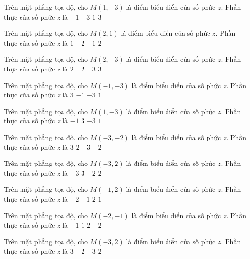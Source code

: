 \begin{ex}
 Trên mặt phẳng tọa độ, cho $M(1,-3)$ là điểm biểu diển của số phức $z$. Phần thực của số phức $z$ là
\choice
{$-1$}
{$-3$}
{\True $1$}
{$3$}
\end{ex}
\begin{ex}
 Trên mặt phẳng tọa độ, cho $M(2,1)$ là điểm biểu diển của số phức $z$. Phần thực của số phức $z$ là
\choice
{$1$}
{$-2$}
{$-1$}
{\True $2$}
\end{ex}
\begin{ex}
 Trên mặt phẳng tọa độ, cho $M(2,-3)$ là điểm biểu diển của số phức $z$. Phần thực của số phức $z$ là
\choice
{\True $2$}
{$-2$}
{$-3$}
{$3$}
\end{ex}
\begin{ex}
 Trên mặt phẳng tọa độ, cho $M(-1,-3)$ là điểm biểu diển của số phức $z$. Phần thực của số phức $z$ là
\choice
{$3$}
{\True $-1$}
{$-3$}
{$1$}
\end{ex}
\begin{ex}
 Trên mặt phẳng tọa độ, cho $M(1,-3)$ là điểm biểu diển của số phức $z$. Phần thực của số phức $z$ là
\choice
{$-1$}
{$3$}
{$-3$}
{\True $1$}
\end{ex}
\begin{ex}
 Trên mặt phẳng tọa độ, cho $M(-3,-2)$ là điểm biểu diển của số phức $z$. Phần thực của số phức $z$ là
\choice
{$3$}
{$2$}
{\True $-3$}
{$-2$}
\end{ex}
\begin{ex}
 Trên mặt phẳng tọa độ, cho $M(-3,2)$ là điểm biểu diển của số phức $z$. Phần thực của số phức $z$ là
\choice
{\True $-3$}
{$3$}
{$-2$}
{$2$}
\end{ex}
\begin{ex}
 Trên mặt phẳng tọa độ, cho $M(-1,2)$ là điểm biểu diển của số phức $z$. Phần thực của số phức $z$ là
\choice
{$-2$}
{\True $-1$}
{$2$}
{$1$}
\end{ex}
\begin{ex}
 Trên mặt phẳng tọa độ, cho $M(-2,-1)$ là điểm biểu diển của số phức $z$. Phần thực của số phức $z$ là
\choice
{$-1$}
{$1$}
{$2$}
{\True $-2$}
\end{ex}
\begin{ex}
 Trên mặt phẳng tọa độ, cho $M(-3,2)$ là điểm biểu diển của số phức $z$. Phần thực của số phức $z$ là
\choice
{$3$}
{$-2$}
{\True $-3$}
{$2$}
\end{ex}
